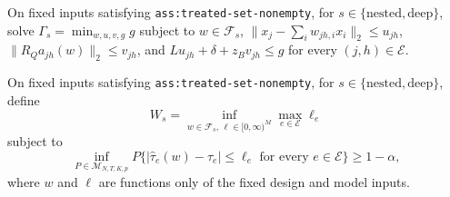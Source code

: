 On fixed inputs satisfying \texttt{ass:treated-set-nonempty}, for
\(s\in\{\mathrm{nested},\mathrm{deep}\}\), solve
\(\Gamma_s=\min_{w,u,v,g}g\) subject to \(w\in\mathcal F_s\),
\(\lVert x_j-\sum_iw_{jh,i}x_i\rVert_2\leq u_{jh}\),
\(\lVert R_Qa_{jh}(w)\rVert_2\leq v_{jh}\), and
\(Lu_{jh}+\delta+z_Bv_{jh}\leq g\) for every
\((j,h)\in\mathcal E\).

On fixed inputs satisfying \texttt{ass:treated-set-nonempty}, for
\(s\in\{\mathrm{nested},\mathrm{deep}\}\), define
\[
 W_s=\inf_{w\in\mathcal F_s,\,\ell\in[0,\infty)^M}
 \max_{e\in\mathcal E}\ell_e
\]
subject to
\[
 \inf_{P\in\mathcal M_{N,T,K,p}}
 P\{ |\widehat\tau_e(w)-\tau_e|\leq\ell_e
       \text{ for every }e\in\mathcal E\}\geq1-\alpha,
\]
where \(w\) and \(\ell\) are functions only of the fixed design and model
inputs.
